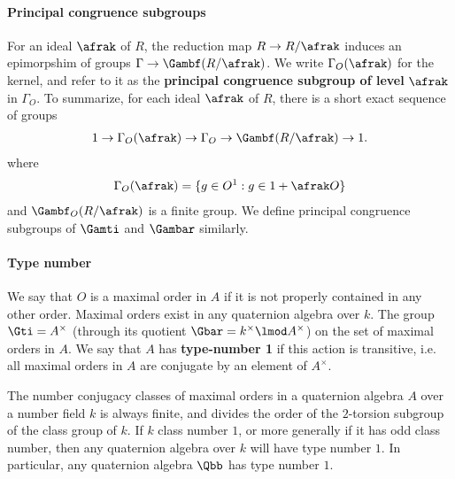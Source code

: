 \paragraph{Principal congruence subgroups}
For an ideal $\afrak$ of $R$, the reduction map $R \to R/\afrak$ induces an epimorpshim of groups $\Gamma \to \Gambf (R/\afrak)$. We write $\Gamma_O(\afrak)$ for the kernel, and refer to it as the \textbf{principal congruence subgroup of level } $\afrak$ in $\Gamma_O$. To summarize, for each ideal $\afrak$ of $R$, there is a short exact sequence of groups
\begin{align*}
    1 \to \Gamma_O (\afrak) \to \Gamma_O \to \Gambf (R/\afrak) \to 1.
\end{align*}
where
\begin{align*}
    \Gamma_O(\afrak) = \{ g \in O^1: g \in 1 + \afrak O\}
\end{align*}
and $\Gambf_O (R/\afrak)$ is a finite group. We define principal congruence subgroups of  $\Gamti$ and $\Gambar$ similarly.

\paragraph{Type number}
We say that $O$ is a maximal order in $A$ if it is not properly contained in any other order. Maximal orders exist in any quaternion algebra over $k$. The group $\Gti = A^\times$ (through its quotient $\Gbar = k^\times \lmod A^\times$) on the set of maximal orders in $A$. We say that $A$ has  \textbf{type-number 1} if this action is transitive, i.e. all maximal orders in $A$ are conjugate by an element of $A^\times$.
\begin{remark}\label{remark:classnum}
    The number conjugacy classes of maximal orders in a quaternion algebra $A$ over a number field $k$ is always finite, and divides the order of the $2$-torsion subgroup of the class group of $k$. If $k$ class number $1$, or more generally if it has odd class number, then any quaternion algebra over $k$ will have type number $1$.  In particular, any quaternion algebra $\Qbb$ has type number $1$.
\end{remark}



